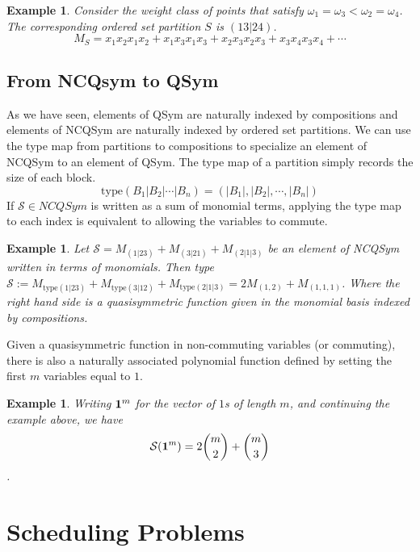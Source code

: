 \documentclass[11pt,letter]{amsart}
\newtheorem{example}[definition]{Example}
\begin{document}
\begin{example}

Consider the weight class of  points that satisfy $\omega_1 = \omega_3 < \omega_2 = \omega_4$.  The corresponding ordered set partition $S$ is $(13|24)$.  
$$M_S = x_1x_2x_1x_2 + x_1x_3x_1x_3 + x_2x_3x_2x_3 + x_3x_4x_3x_4 + \cdots$$  

\end{example}

\subsection{From NCQsym to QSym}

As we have seen, elements of QSym are naturally indexed by
compositions and elements of NCQSym are naturally indexed by ordered
set partitions.  We can use the type map from partitions to
compositions to specialize an element of NCQSym to an element of QSym.
The type map of a partition simply records the size of each block.
$$\textrm{type}(B_1|B_2|\cdots|B_n) = (|B_1|, |B_2|, \cdots, |B_n|)$$
If $\mathcal{S} \in NCQSym$ is written as a sum of monomial terms,
applying the type map to each index is equivalent to allowing the
variables to commute.

\begin{example}
Let $\mathcal{S} = M_{(1|23)} + M_{(3|21)} + M_{(2|1|3)}$ be an element of NCQSym written in terms of monomials.  Then 
{type} $\mathcal{S} :=  M_{\textrm{type} (1|23)} + M_{\textrm{type} (3|12)} + M_{\textrm{type} (2|1|3)} = 2 M_{(1,2)} + M_{(1,1,1)}$. Where the right hand side is a quasisymmetric function given in the monomial basis indexed by compositions.  
\end{example}



Given a quasisymmetric function in non-commuting variables (or
commuting), there is also a naturally associated polynomial function
defined by setting the first $m$ variables equal to $1$. 

\begin{example}
Writing ${\bf 1}^m$ for the vector of $1$s of length $m$, and continuing the example above, we have 
$$ \mathcal{S}({\bf 1}^m) = 2 {m \choose 2} + {m \choose 3}$$.  

\end{example}


\section{Scheduling Problems}
\end{document}
